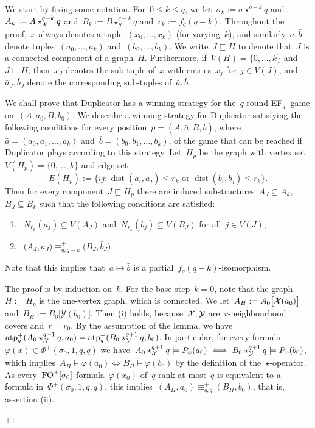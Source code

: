 \documentclass[11pt]{article}
\numberwithin{equation}{section}
\newcommand{\st}{\mathrel : }
\newcommand{\YYY}{\mathcal{Y}} \newcommand{\ZZZ}{\mathcal{Z}}
\newcommand{\FO}{\textup{FO}}
\newcommand{\atp}{\operatorname{atp}^+}
\newcommand{\dist}{\operatorname{dist}}
\renewcommand{\phi}{\varphi}
\newcommand{\tup}[1]{\bar{#1}}
\def\qed{\hspace*{\fill}$\Box$}
\newenvironment{proof}[1][]%
{\ifthenelse{\equal{#1}{}}{\noindent\textit{Proof.
    }}{\noindent\textit{#1. }}}%
{\qed\par\smallskip}
\begin{document}
\begin{proof}
  We start by fixing some notation.  For~$0\le k\le q$, we
  let~$\sigma_k:=\sigma\star^{q-k} q$ and~$A_k:=A\star^{q-k}_{\mathcal{X}} q$
  and~$B_k:=B\star^{q-k}_{\YYY}q$ and~$r_k:=f_q(q-k)$.  Throughout the
  proof,~$\tup x$ always denotes a tuple~$(x_0,\ldots,x_k)$ (for
  varying~$k$), and similarly~$\tup a,\tup b$ denote
  tuples~$(a_0,\ldots,a_k)$ and~$(b_0,\ldots,b_k)$.  We
  write~$J\sqsubseteq H$ to denote that~$J$ is a connected component
  of a graph~$H$. Furthermore, if~$V(H)=\{0,\ldots,k\}$
  and~$J\sqsubseteq H$, then~$\tup x_J$ denotes the sub-tuple of~$\tup
  x$ with entries~$x_j$ for~$j\in V(J)$, and~$\tup a_J,\tup b_J$
  denote the corresponding sub-tuples of~$\tup a,\tup b$.

  We shall prove that Duplicator has a winning strategy for
  the~$q$-round EF$_q^+$ game on~$(A,a_0,B,b_0)$.  We describe a
  winning strategy for Duplicator satisfying the following conditions
  for every position~$p=(A,\tup a,B,\tup b)$, where~$\tup a=(a_0,
  a_1,\ldots,a_k)$ and~$\tup b=(b_0, b_1,\ldots,b_k)$, of the game
  that can be reached if Duplicator plays according to this
  strategy. Let~$H_p$ be the graph with vertex set~$V(H_p)=\{0,\ldots,
  k\}$ and edge set
  \[
  E(H_p):=\big\{ij\st \dist(a_i,a_j)\le r_k\text{ or
  }\dist(b_i,b_j)\le r_k\big\}.
  \]
  Then for every component~$J\sqsubseteq H_p$ there are induced
  substructures~$A_J\subseteq A_k$,~$B_J\subseteq B_k$ such that the
  following conditions are satisfied:
  \begin{enumerate}
  \item [(i)]~$N_{r_k}(a_j)\subseteq V(A_J)$ and~$N_{r_k}(b_j)\subseteq
    V(B_J)$ for all~$j\in V(J)$;
  \item[(ii)]~$\big(A_J,\tup a_J\big)\equiv_{q,q-k}^+
    \big(B_J,\tup b_J\big)$.
  \end{enumerate}
  Note that this implies that~$\tup{a}\mapsto \tup{b}$ is
  a partial~$f_q(q-k)$-isomorphism.

  The proof is by induction on~$k$. For the base step~$k=0$, note that
  the graph~$H:=H_{p}$ is the one-vertex graph, which is connected. We
  let~$A_H:=A_0\big[\mathcal{X}(a_0)\big]$ and~$B_H:=B_0\big[\YYY(b_0)\big]$.
  Then (i) holds, because~$\XXX,\YYY$ are~$r$-neighbourhood covers
  and~$r=r_0$. By the assumption of the lemma, we
  have~$\atp_q(A_0\star_\XXX^{q+1} q,a_0)=\atp_q(B_0\star_\YYY^{q+1}
  q,b_0)$. In particular, for every
  formula~$\phi(x)\in\Phi^+(\sigma_0,1,q,q)$ we
  have~$A_0\star_\XXX^{q+1} q\models P_\phi(a_0)\iff
  B_0\star_\YYY^{q+1} q\models P_\phi(b_0)$, which
  implies~$A_H\models\phi(a_0)\iff B_H\models\phi(b_0)$ by the
  definition of the~$\star$-operator. As
  every~$\FO^+[\sigma_0]$-formula~$\phi(x_0)$ of~$q$-rank at most~$q$
  is equivalent to a formula in~$\Phi^+(\sigma_0,1,q,q)$, this
  implies~$(A_H,a_0)\equiv^+_{q,q}(B_H,b_0)$, that is, assertion (ii).


\end{proof}
\end{document}
